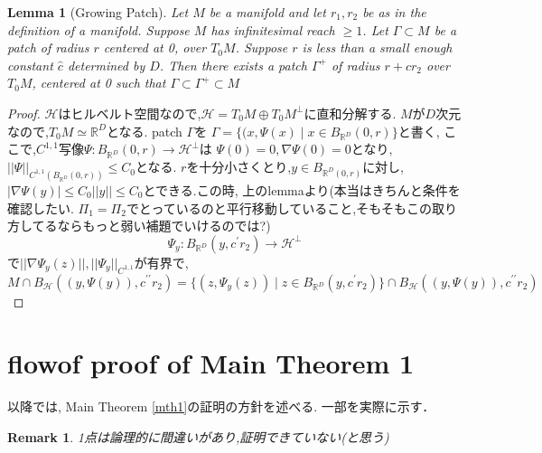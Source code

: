 \documentclass{ujarticle}
\newtheorem{lem}[thm]{Lemma}
\newtheorem*{rem}{Remark}
\begin{document}
\begin{lem}[Growing Patch]
  Let $M$ be a manifold and let $r_1,r_2$ be as in the definition of a manifold.
Suppose $M$ has infinitesimal reach $ \ge 1$. Let $\Gamma \subset M$ be a patch of radius $r$ centered at 0, over $T_0M$. Suppose
$r$ is less than a small enough constant $\hat{c}$ determined by $D$. Then there exists a patch $\Gamma^{+}$ of radius $r + cr_2$
over $T_0M$, centered at 0 such that $\Gamma \subset \Gamma^{+} \subset M$
\end{lem}
\begin{proof}
 $\mathcal{H}$はヒルベルト空間なので,$\mathcal{H}=T_0M \oplus T_0M^{\perp}$に直和分解する.
 $M$が$D$次元なので,$T_0M \simeq \mathbb{R}^D$となる.
 patch $\Gamma$を
 $\Gamma =\{(x,\Psi(x) \mid x \in B_{\mathbb{R}^D}(0,r) \}$と書く,
ここで,$C^{1,1}$写像$\Psi: B_{\mathbb{R}^D}(0,r) \to \mathcal{H}^{\perp}$は
$\Psi(0)=0,\nabla\Psi(0)=0$となり,$||\Psi||_{C^{1,1}(B_{\mathbb{R}^D}(0,r))} \le C_0$となる.
$r$を十分小さくとり,$y \in B_{\mathbb{R}^D(0,r)}$に対し,
$|\nabla \Psi(y)| \le C_0||y|| \le C_0$とできる.この時,
上のlemmaより(本当はきちんと条件を確認したい.
$\Pi_1=\Pi_2$でとっているのと平行移動していること,そもそもこの取り方してるならもっと弱い補題でいけるのでは?)
\begin{equation*}
 \Psi_y:B_{\mathbb{R}^D}(y,c^{\prime} r_2) \to \mathcal{H}^{\perp}
\end{equation*}
で$||\nabla\Psi_y(z)||,||\Psi_y||_{C^{1,1}}$が有界で,
\begin{equation*}
 M \cap B_{\mathcal{H}}((y,\Psi(y)),c^{\prime\prime} r_2) =
 \{ (z,\Psi_y(z)) \mid z \in B_{\mathbb{R}^D}(y,c^{\prime} r_2)\}
 \cap B_{\mathcal{H}}((y,\Psi(y)),c^{\prime\prime} r_2)
\end{equation*}
\end{proof}

\section{flowof proof of Main Theorem 1}
\label{sec:証明のフロー}
以降では,
Main Theorem \ref{mth1}の証明の方針を述べる.
一部を実際に示す．
\begin{rem}
1点は論理的に間違いがあり,証明できていない(と思う)
\end{rem}
\end{document}
